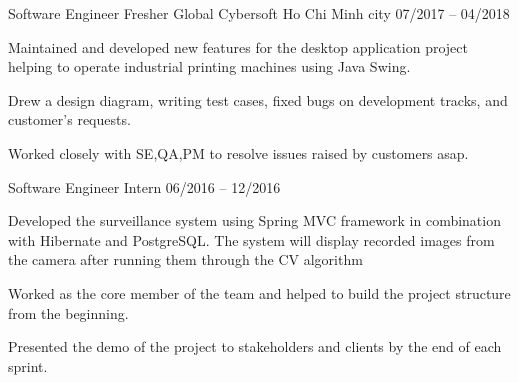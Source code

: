 \begin{cventries}
  \cventry
    {Software Engineer Fresher} %
    {Global Cybersoft} %
    {Ho Chi Minh city} %
    {07/2017 -- 04/2018} %
    {
      \begin{cvitems} %
        \item {Maintained and developed new features for the desktop application project helping to operate industrial printing machines using Java Swing.}
        \item {Drew a design diagram, writing test cases, fixed bugs on development tracks, and customer’s requests.}
        \item{Worked closely with SE,QA,PM to resolve issues raised by customers asap.}
      \end{cvitems}
    }

    \cventry
    {Software Engineer Intern} %
    {} %
    {} %
    {06/2016 -- 12/2016} %
    {
      \begin{cvitems} %
        \item {Developed the surveillance system using Spring MVC framework in combination with Hibernate and PostgreSQL. The system will display recorded images from the camera after running them through the CV algorithm}
        \item {Worked as the core member of the team and helped to build the project structure from the beginning.}
        \item{Presented the demo of the project to stakeholders and clients by the end of each sprint.}
      \end{cvitems}
    }

\end{cventries}
